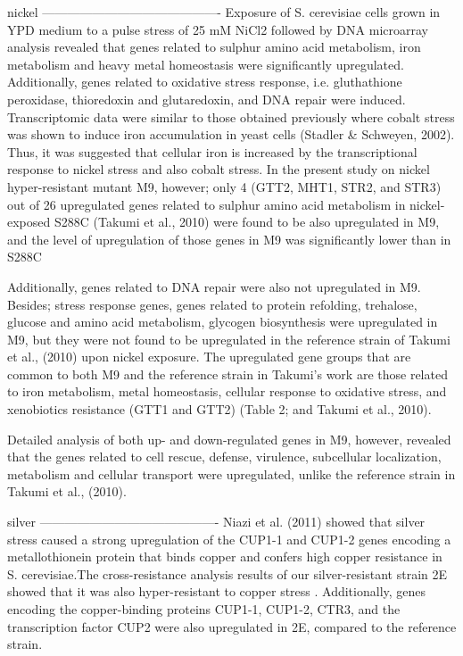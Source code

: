 nickel
-------------------------------------------
Exposure of S. cerevisiae cells grown in YPD medium to a pulse stress of 25 mM NiCl2 followed by
DNA microarray analysis revealed that genes related to sulphur amino acid metabolism,
iron metabolism and heavy metal homeostasis were significantly upregulated.
Additionally, genes related to oxidative stress response, i.e. gluthathione peroxidase,
thioredoxin and glutaredoxin, and DNA repair were induced. Transcriptomic data were similar to those obtained previously where cobalt stress was shown to induce iron
accumulation in yeast cells (Stadler & Schweyen, 2002). Thus, it was suggested that
cellular iron is increased by the transcriptional response to nickel stress and also cobalt
stress. In the present study on nickel hyper-resistant mutant M9, however; only 4 (GTT2,
MHT1, STR2, and STR3) out of 26 upregulated genes related to sulphur amino acid
metabolism in nickel-exposed S288C (Takumi et al., 2010) were found to be also
upregulated in M9, and the level of upregulation of those genes in M9 was significantly
lower than in S288C

Additionally, genes related to DNA repair were also not
upregulated in M9. Besides; stress response genes, genes related to protein refolding,
trehalose, glucose and amino acid metabolism, glycogen biosynthesis were upregulated
in M9, but they were not found to be upregulated in the reference strain of Takumi et
al., (2010) upon nickel exposure.  The upregulated gene groups that are common to both
M9 and the reference strain in Takumi’s work are those related to iron metabolism,
metal homeostasis, cellular response to oxidative stress, and xenobiotics resistance
(GTT1 and GTT2) (Table 2; and Takumi et al., 2010).

Detailed analysis of
both up- and down-regulated genes in M9, however, revealed that the genes related to
cell rescue, defense, virulence, subcellular localization, metabolism and cellular
transport were upregulated, unlike the reference strain in Takumi et al., (2010).


silver
-------------------------------------------
Niazi et al. (2011) showed that silver stress caused a strong upregulation of the CUP1-1 and CUP1-2 genes encoding a metallothionein protein that binds copper and confers high copper resistance in S. cerevisiae.The cross-resistance analysis results of our silver-resistant strain 2E showed that it was also hyper-resistant to copper stress . Additionally, genes encoding the copper-binding proteins CUP1-1, CUP1-2, CTR3, and the transcription factor CUP2 were also upregulated in 2E, compared to the reference strain.

